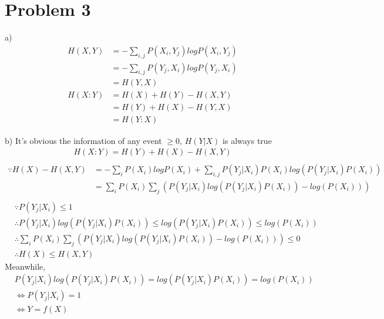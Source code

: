 \section*{Problem 3}

\begin{note}{a)}
    \begin{align*}
        H(X, Y) &= -\sum_{i, j} P(X_i, Y_j)logP(X_i, Y_j) \\
                &= -\sum_{i, j} P(Y_j, X_i)logP(Y_j, X_i) \\
                &= H(Y, X) \\
        H(X: Y) &= H(X) + H(Y) - H(X, Y) \\
                &= H(Y) + H(X) - H(Y, X) \\
                &= H(Y: X)
    \end{align*}
\end{note}

\begin{note}{b)}
    It's obvious the information of any event $\geq 0$, $H(Y|X)$ is always true
    \begin{align*}
        H(X:Y) = H(Y) + H(X) - H(X,Y) \\
    \end{align*}
    \begin{align*}
        \because H(X) - H(X, Y) &= -\sum_{i}P(X_i)logP(X_i) + \sum_{i, j}P(Y_j|X_i)P(X_i)log(P(Y_j|X_i)P(X_i)) \\
        &= \sum_i P(X_i)\sum_j (P(Y_j|X_i)log(P(Y_j|X_i)P(X_i)) - log(P(X_i))) \\
    \end{align*}
    \begin{align*}
        &\because P(Y_j|X_i)\leq 1 \\
        &\therefore P(Y_j|X_i)log(P(Y_j|X_i)P(X_i)) \leq log(P(Y_j|X_i)P(X_i))\leq log(P(X_i)) \\
        &\therefore \sum_i P(X_i)\sum_j (P(Y_j|X_i)log(P(Y_j|X_i)P(X_i)) - log(P(X_i))) \leq 0 \\
        &\therefore H(X) \leq H(X, Y)
    \end{align*}
    Meanwhile, 
    \begin{align*}
        &P(Y_j|X_i)log(P(Y_j|X_i)P(X_i)) = log(P(Y_j|X_i)P(X_i))= log(P(X_i)) \\
        &\iff P(Y_j|X_i) = 1 \\
        &\iff Y=f(X)
    \end{align*}
\end{note}

